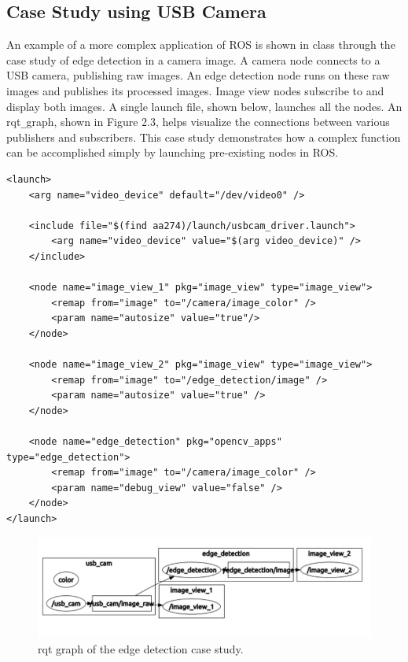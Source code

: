 \documentclass[twoside]{article}
\begin{document}
\subsection{Case Study using USB Camera}
An example of a more complex application of ROS is shown in class through the case study of edge detection in a camera image. A camera node connects to a USB camera, publishing raw images. An edge detection node runs on these raw images and publishes its processed images. Image view nodes subscribe to and display both images. A single launch file, shown below, launches all the nodes. An rqt\verb|_|graph, shown in Figure 2.3, helps visualize the connections between various publishers and subscribers. This case study demonstrates how a complex function can be accomplished simply by launching pre-existing nodes in ROS.

\begin{verbatim}
<launch>
    <arg name="video_device" default="/dev/video0" />

    <include file="$(find aa274)/launch/usbcam_driver.launch">
        <arg name="video_device" value="$(arg video_device)" />
    </include>

    <node name="image_view_1" pkg="image_view" type="image_view">
        <remap from="image" to="/camera/image_color" />
        <param name="autosize" value="true"/>
    </node>

    <node name="image_view_2" pkg="image_view" type="image_view">
        <remap from="image" to="/edge_detection/image" />
        <param name="autosize" value="true" />
    </node>

    <node name="edge_detection" pkg="opencv_apps" type="edge_detection">
        <remap from="image" to="/camera/image_color" />
        <param name="debug_view" value="false" />
    </node>
</launch>
\end{verbatim}

\begin{figure}[ht]
\centering
\includegraphics[width=1\textwidth]{USBCamera}
\caption{rqt graph of the edge detection case study.}
\end{figure}
\end{document}

